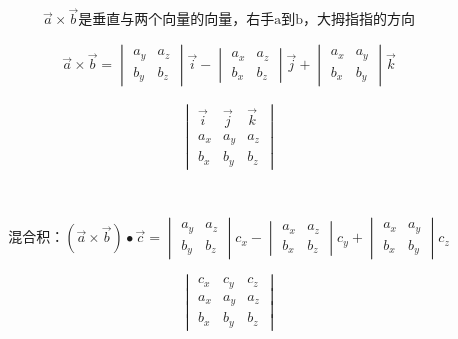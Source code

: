 $$\overrightarrow{a}\times\overrightarrow{b}\mbox{是垂直与两个向量的向量，右手a到b，大拇指指的方向}$$
\begin{minipage}{.7\textwidth}
\begin{align}
	\overrightarrow{a}\times\overrightarrow{b}=\begin{vmatrix}
		a_y & a_z\\
		b_y & b_z
	\end{vmatrix}\overrightarrow{i}-\begin{vmatrix}
		a_x & a_z\\
		b_x & b_z
	\end{vmatrix}\overrightarrow{j}+\begin{vmatrix}
		a_x & a_y\\
		b_x & b_y
	\end{vmatrix}\overrightarrow{k}\label{Vector_product_coordinate}
\end{align}
\end{minipage}
\hfill
\begin{minipage}{.3\textwidth}
$$\begin{vmatrix}
	\overrightarrow{i} & \overrightarrow{j} & \overrightarrow{k}\\
	a_x & a_y & a_z\\
	b_x & b_y & b_z
\end{vmatrix}$$
\end{minipage}\\
\par
\begin{minipage}{.7\textwidth}
$$\mbox{混合积：}(\overrightarrow{a}\times\overrightarrow{b})\bullet\overrightarrow{c}=\begin{vmatrix}
	a_y & a_z\\
	b_y & b_z
\end{vmatrix}c_x-\begin{vmatrix}
	a_x & a_z\\
	b_x & b_z
\end{vmatrix}c_y+\begin{vmatrix}
	a_x & a_y\\
	b_x & b_y
\end{vmatrix}c_z$$
\end{minipage}
\hfill
\begin{minipage}{.3\textwidth}
$$\begin{vmatrix}
	c_x & c_y & c_z\\
	a_x & a_y & a_z\\
	b_x & b_y & b_z
\end{vmatrix}$$
\end{minipage}
